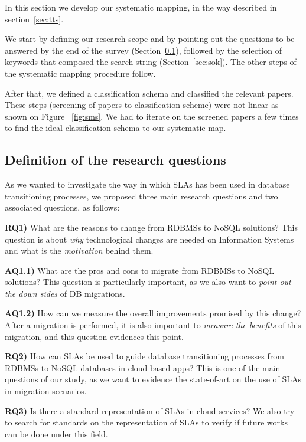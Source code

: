 \documentclass[a4paper]{IEEEtran}
\begin{document}
In this section we develop our systematic mapping, in the way described in section~\ref{sec:tts}.

We start by defining our research scope and by pointing out the questions to be answered by the end of the survey (Section~\ref{sec:drq}), followed by the selection of keywords that composed the search string (Section~\ref{sec:sok}).
The other steps of the systematic mapping procedure follow.

After that, we defined a classification schema and classified the relevant papers. These steps (screening of papers to classification scheme) were not linear as shown on Figure ~\ref{fig:sms}. We had to iterate on the screened papers a few times to find the ideal classification schema to our systematic map.

\subsection{Definition of the research questions}
\label{sec:drq}

As we wanted to investigate the way in which SLAs has been used in database transitioning processes, we proposed three main research questions and two associated questions, as follows:

\noindent\textbf{RQ1)} What are the reasons to change from RDBMSs to NoSQL solutions? This question is about \textit{why} technological changes are needed on Information Systems and what is the \textit{motivation} behind them. 

\textbf{AQ1.1)} What are the pros and cons to migrate from RDBMSs to NoSQL solutions? This question is particularly important, as we also want to \textit{point out the down sides} of DB migrations.
 
\textbf{AQ1.2)} How can we measure the overall improvements promised by this change? After a migration is performed, it is also important to \textit{measure the benefits} of this migration, and this question evidences this point. 

\noindent\textbf{RQ2)} How can SLAs be used to guide database transitioning processes from RDBMSs to NoSQL databases in cloud-based apps? This is one of the main questions of our study, as we want to evidence the state-of-art on the use of SLAs in migration scenarios. 

\noindent\textbf{RQ3)} Is there a standard representation of SLAs in cloud services? We also try to search for standards on the representation of SLAs to verify if future works can be done under this field.
\end{document}
